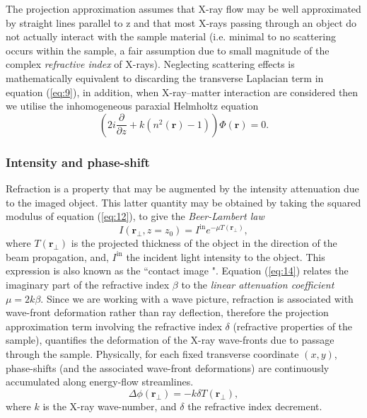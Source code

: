 \documentclass[10pt, a4paper, singlespacing]{report}
\begin{document}
The projection approximation assumes that X-ray flow may be well approximated by straight lines parallel to z\cite{PagsTutes} and that most X-rays passing through an object do not actually interact with the sample material (i.e. minimal to no scattering occurs within the sample, a fair assumption due to small magnitude of the complex \textit{refractive index} of X-rays). Neglecting scattering effects is mathematically equivalent to discarding the transverse Laplacian term in equation (\ref{eq:9})\cite{CH49}, in addition, when X-ray--matter interaction are considered then we utilise the inhomogeneous paraxial Helmholtz equation
\begin{equation}\label{eq:13}
\left ( 2 i \frac{\partial }{\partial z} + k ( n^2 (\mathbf{r}) - 1 )\right ) \Phi(\mathbf{r}) = 0.
\end{equation}

\subsubsection{Intensity and phase-shift}\label{Intensity and phase}
Refraction is a property that may be augmented by the intensity attenuation due to the imaged object. This latter quantity may be obtained by taking the squared
modulus of equation (\ref{eq:12}), to give the \textit{Beer-Lambert law}\cite{PagsTutes}
\begin{equation}\label{eq:14}
I(\mathbf{r}_{\perp}, z = z_0) = I^{\mathrm{in}} e^{-\mu T(\mathbf{r}_{\perp})},
\end{equation}
where $T(\mathbf{r}_{\perp})$ is the projected thickness of the object in the direction of the beam propagation, and, $I^{\mathrm{in}}$ the incident light intensity to the object. This expression is also known as the ``contact image ". Equation (\ref{eq:14}) relates the imaginary part of the refractive index $\beta$ to the \textit{linear attenuation coefficient} $\mu = 2k\beta$. 
Since we are working with a wave picture, refraction is associated with wave-front deformation rather than ray deflection, therefore the projection approximation term involving the refractive index $\delta$ (refractive properties of the sample), quantifies the deformation of the X-ray wave-fronts due to passage through the sample. Physically, for each fixed transverse coordinate $(x, y)$, phase-shifts (and the associated wave-front deformations) are continuously accumulated along energy-flow streamlines\cite{PagsTutes}.
\begin{equation}\label{eq:15}
\Delta \phi(\mathbf{r}_{\perp}) = -k \delta T(\mathbf{r}_{\perp}),
\end{equation}
where $k$ is the X-ray wave-number, and $\delta$ the refractive index decrement.
\end{document}
